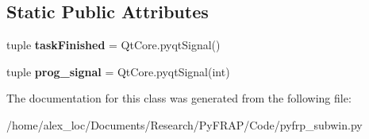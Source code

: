 \subsection*{Static Public Attributes}
\begin{DoxyCompactItemize}
\item 
\hypertarget{classpyfrp__subwin_1_1analyze__thread_a10302ef773f3c87e6b21daeeaceb50cb}{tuple {\bfseries task\+Finished} = Qt\+Core.\+pyqt\+Signal()}\label{classpyfrp__subwin_1_1analyze__thread_a10302ef773f3c87e6b21daeeaceb50cb}

\item 
\hypertarget{classpyfrp__subwin_1_1analyze__thread_adbc6e93966305a425126903c1e29ba2f}{tuple {\bfseries prog\+\_\+signal} = Qt\+Core.\+pyqt\+Signal(int)}\label{classpyfrp__subwin_1_1analyze__thread_adbc6e93966305a425126903c1e29ba2f}

\end{DoxyCompactItemize}


The documentation for this class was generated from the following file\+:\begin{DoxyCompactItemize}
\item 
/home/alex\+\_\+loc/\+Documents/\+Research/\+Py\+F\+R\+A\+P/\+Code/pyfrp\+\_\+subwin.\+py\end{DoxyCompactItemize}
